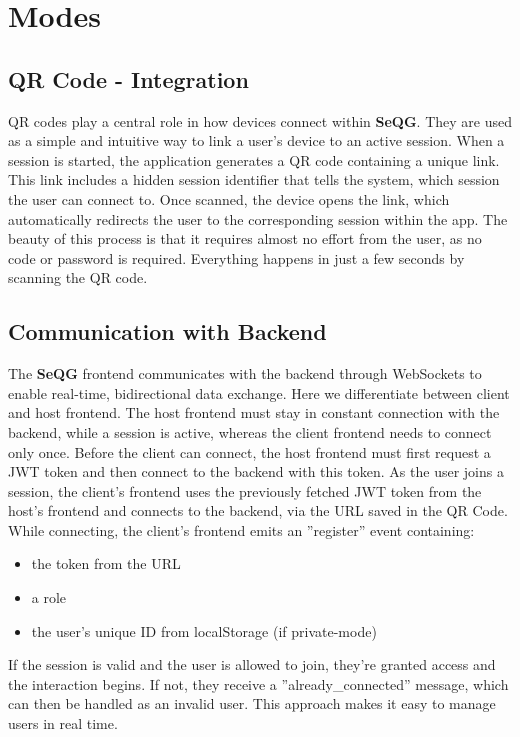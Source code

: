 \section{Modes}

\subsection{QR Code - Integration}
QR codes play a central role in how devices connect within \textbf{SeQG}. 
They are used as a simple and intuitive way to link a user's device to an active session. 
When a session is started, the application generates a QR code containing a unique link. 
This link includes a hidden session identifier that tells the system, which session the user can connect to.
Once scanned, the device opens the link, which automatically redirects the user to the corresponding session within the app. 
The beauty of this process is that it requires almost no effort from the user, as no code or password is required. 
Everything happens in just a few seconds by scanning the QR code.

\subsection{Communication with Backend}
The \textbf{SeQG} frontend communicates with the backend through WebSockets to enable real-time, bidirectional data exchange. 
Here we differentiate between client and host frontend.
The host frontend must stay in constant connection with the backend, while a session is active, whereas the client frontend needs to connect only once. 
Before the client can connect, the host frontend must first request a JWT token and then connect to the backend with this token.
As the user joins a session, the client's frontend uses the previously fetched JWT token from the host's frontend and connects to the backend, via the URL saved in the QR Code. 
While connecting, the client's frontend emits an ''register'' event containing:
\begin{itemize}
    \item the token from the URL
    \item a role
    \item the user's unique ID from localStorage (if private-mode)
\end{itemize}
If the session is valid and the user is allowed to join, they're granted access and the interaction begins. 
If not, they receive a ''already\_connected'' message, which can then be handled as an invalid user.
This approach makes it easy to manage users in real time.



